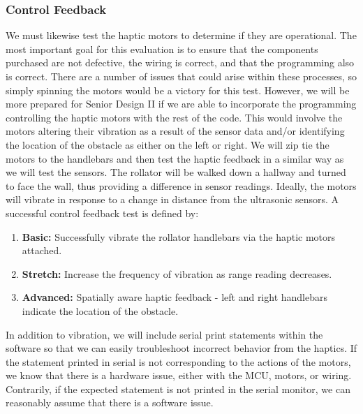 \subsubsection{Control Feedback}
\noindent We must likewise test the haptic motors to determine if they are operational. The most important goal for this evaluation is to ensure that the components purchased are not defective, the wiring is correct, and that the programming also is correct. There are a number of issues that could arise within these processes, so simply spinning the motors would be a victory for this test. However, we will be more prepared for Senior Design II if we are able to incorporate the programming controlling the haptic motors with the rest of the code. This would involve the motors altering their vibration as a result of the sensor data and/or identifying the location of the obstacle as either on the left or right. We will zip tie the motors to the handlebars and then test the haptic feedback in a similar way as we will test the sensors. The rollator will be walked down a hallway and turned to face the wall, thus providing a difference in sensor readings. Ideally, the motors will vibrate in response to a change in distance from the ultrasonic sensors. A successful control feedback test is defined by:

\begin{enumerate}
	\item \textbf{Basic:} Successfully vibrate the rollator handlebars via the haptic motors attached.
	\item \textbf{Stretch:} Increase the frequency of vibration as range reading decreases.
	\item \textbf{Advanced:} Spatially aware haptic feedback - left and right handlebars indicate the location of the obstacle.
\end{enumerate}

 
 \noindent In addition to vibration, we will include serial print statements within the software so that we can easily troubleshoot incorrect behavior from the haptics. If the statement printed in serial is not corresponding to the actions of the motors, we know that there is a hardware issue, either with the MCU, motors, or wiring. Contrarily, if the expected statement is not printed in the serial monitor, we can reasonably assume that there is a software issue.\\


